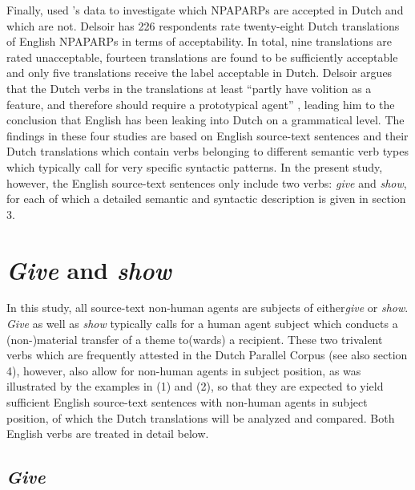 \documentclass[output=paper]{LSP/langsci}
\begin{document}
Finally, \citet{Delsoir2011} used \citeauthor{Vandepitte2011}'s \citeyear{Vandepitte2011} data to investigate which NPAPARPs are accepted in Dutch and which are not. Delsoir has 226 respondents rate twenty-eight Dutch translations of English NPAPARPs in terms of acceptability. In total, nine translations are rated unacceptable, fourteen translations are found to be sufficiently acceptable and only five translations receive the label acceptable in Dutch. Delsoir argues that the Dutch verbs in the translations at least “partly have volition as a feature, and therefore should require a prototypical agent” \citet[34]{Vandepitte2011}, leading him to the conclusion that English has been leaking into Dutch on a grammatical level. 
The findings in these four studies are based on English source-text sentences and their Dutch translations which contain verbs belonging to different semantic verb types which typically call for very specific syntactic patterns. In the present study, however, the English source-text sentences only include two verbs: \textit{give} and \textit{show}, for each of which a detailed semantic and syntactic description is given in section 3.  

\section{\textit{Give} and \textit{show}}

In this study, all source-text non-human agents are subjects of either\textit{give} or \textit{show}. \textit{Give} as well as \textit{show} typically calls for a human agent subject which conducts a (non-)material transfer of a theme to(wards) a recipient. These two trivalent verbs which are frequently attested in the Dutch Parallel Corpus (see also section 4), however, also allow for non-human agents in subject position, as was illustrated by the examples in (1) and (2), so that they are expected to yield sufficient English source-text sentences with non-human agents in subject position, of which the Dutch translations will be analyzed and compared. Both English verbs are treated in detail below.  
  
\subsection{\textit{Give}}
\end{document}
